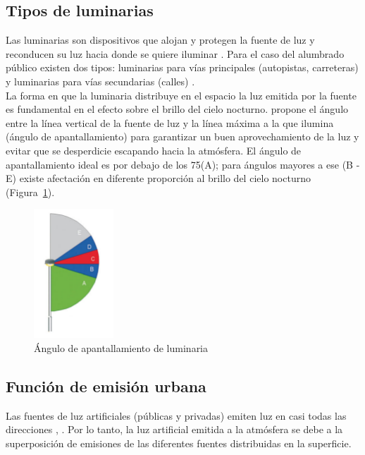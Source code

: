 \newpage

\subsection{Tipos de luminarias}
\label{subsec:luminarias}

Las luminarias son dispositivos que alojan y protegen la fuente de luz y reconducen su luz hacia donde se quiere iluminar \citep{LibroCL}. Para el caso del alumbrado público existen dos tipos: luminarias para vías principales (autopistas, carreteras) y luminarias para vías secundarias (calles) \citep{INFO2019}.\\

La forma en que la luminaria distribuye en el espacio la luz emitida por la fuente es fundamental en el efecto sobre el brillo del cielo nocturno. \cite{Marin2009} propone el ángulo entre la línea vertical de la fuente de luz y la línea máxima a la que ilumina (ángulo de apantallamiento) para garantizar un buen aprovechamiento de la luz y evitar que se desperdicie escapando hacia la atmósfera. El ángulo de apantallamiento ideal es por debajo de los 75\grad (A); para ángulos mayores a ese (B - E) existe afectación en diferente proporción al brillo del cielo nocturno (Figura~\ref{anguloapantallamiento}).


\begin{figure}[htb]
  \centering
    \includegraphics[width=30mm, scale=0.3]{anguloapantallamiento}
  \caption{Ángulo de apantallamiento de luminaria \citep{Marin2009}}
  \label{anguloapantallamiento}
\end{figure}


\subsection{Función de emisión urbana}
\label{subsec:funciondemisionurbana}

Las fuentes de luz artificiales (públicas y privadas) emiten luz en casi todas las direcciones \citep{Kocifaj2014}, \citep{Kocifaj2016}. Por lo tanto, la luz artificial emitida a la atmósfera se debe a la superposición de emisiones de las diferentes fuentes distribuidas en la superficie.\\

